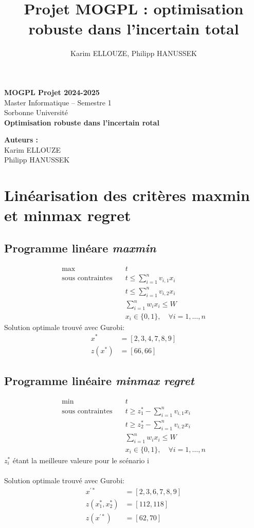 \documentclass[10pt,a4paper]{report}
\author{Karim ELLOUZE, Philipp HANUSSEK}
\title{Projet MOGPL : optimisation robuste dans l’incertain total}
\begin{document}
\begin{titlepage}
    \centering
    \vspace*{4cm}
    {\Huge \textbf{MOGPL Projet 2024-2025}}\\[1.5cm]
    {\Large Master Informatique -- Semestre 1}\\[0.5cm]
    {\large Sorbonne Université}\\[2.5cm]
    {\Large \textbf{Optimisation robuste dans l'incertain rotal}}\\[3cm]
    \vfill
    \begin{flushright}
        \textbf{Auteurs :}\\
        Karim ELLOUZE\\
        Philipp HANUSSEK
    \end{flushright}
    \vspace*{2cm}
\end{titlepage}
\newpage
\chapter{Linéarisation des critères maxmin et minmax regret}
\section{Programme linéare \textit{maxmin}}
\begin{align*}
\max \quad & t \\
\text{sous contraintes} \quad & t \leq \sum_{i=1}^{n} v_{i,1} x_i \\
& t \leq \sum_{i=1}^{n} v_{i,2} x_i \\
& \sum_{i=1}^{n} w_i x_i \leq W \\
& x_i \in \{0, 1\}, \quad \forall i = 1, \ldots, n
\end{align*}
Solution optimale trouvé avec Gurobi:
\begin{align*}
	x^* 	&= [2, 3, 4, 7, 8, 9]\\
	z(x^*) 	&= [66,66]
\end{align*}
\section{Programme linéaire \textit{minmax regret}}
\begin{align*}
\min \quad & t \\
\text{sous contraintes} \quad & t \geq z_1^* - \sum_{i=1}^{n} v_{i,1} x_i \\
& t \geq z_2^* - \sum_{i=1}^{n} v_{i,2} x_i \\
& \sum_{i=1}^{n} w_i x_i \leq W \\
& x_i \in \{0, 1\}, \quad \forall i = 1, \ldots, n
\end{align*}
$z_i^*$ étant la meilleure valeure pour le scénario i\\\\
Solution optimale trouvé avec Gurobi:
\begin{align*}
	x^{'*} 	&= [2, 3, 6, 7, 8, 9]\\
	z(x_1^*,x_2^*) &= [112,118]\\ 
	z(x^{'*}) 	&= [62,70]
\end{align*}
\end{document}
